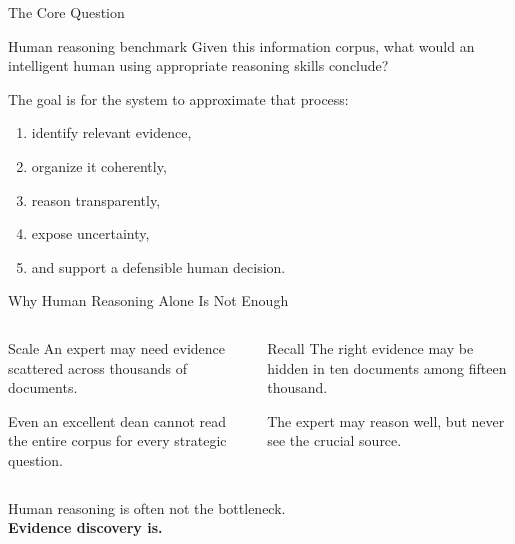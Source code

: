 \documentclass[aspectratio=169]{beamer}
\begin{document}
\begin{frame}{The Core Question}

\Large

\begin{block}{Human reasoning benchmark}
Given this information corpus, what would an intelligent human using appropriate reasoning skills conclude?
\end{block}

\vspace{0.7cm}

The goal is for the system to approximate that process:

\begin{enumerate}
\item identify relevant evidence,
\item organize it coherently,
\item reason transparently,
\item expose uncertainty,
\item and support a defensible human decision.
\end{enumerate}

\end{frame}

\begin{frame}{Why Human Reasoning Alone Is Not Enough}

\begin{columns}[T]


\begin{block}{Scale}
An expert may need evidence scattered across thousands of documents.

\vspace{0.2cm}

Even an excellent dean cannot read the entire corpus for every strategic question.
\end{block}


\begin{block}{Recall}
The right evidence may be hidden in ten documents among fifteen thousand.

\vspace{0.2cm}

The expert may reason well, but never see the crucial source.
\end{block}

\end{columns}

\vspace{0.7cm}

\begin{center}
\Large
Human reasoning is often not the bottleneck.\\[0.2cm]
\textbf{Evidence discovery is.}
\end{center}

\end{frame}
\end{document}
